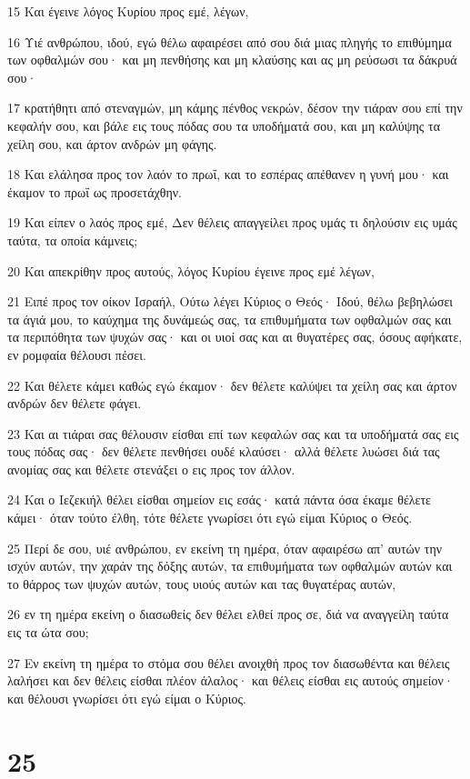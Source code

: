 \par 15 Και έγεινε λόγος Κυρίου προς εμέ, λέγων,
\par 16 Υιέ ανθρώπου, ιδού, εγώ θέλω αφαιρέσει από σου διά μιας πληγής το επιθύμημα των οφθαλμών σου· και μη πενθήσης και μη κλαύσης και ας μη ρεύσωσι τα δάκρυά σου·
\par 17 κρατήθητι από στεναγμών, μη κάμης πένθος νεκρών, δέσον την τιάραν σου επί την κεφαλήν σου, και βάλε εις τους πόδας σου τα υποδήματά σου, και μη καλύψης τα χείλη σου, και άρτον ανδρών μη φάγης.
\par 18 Και ελάλησα προς τον λαόν το πρωΐ, και το εσπέρας απέθανεν η γυνή μου· και έκαμον το πρωΐ ως προσετάχθην.
\par 19 Και είπεν ο λαός προς εμέ, Δεν θέλεις απαγγείλει προς υμάς τι δηλούσιν εις υμάς ταύτα, τα οποία κάμνεις;
\par 20 Και απεκρίθην προς αυτούς, λόγος Κυρίου έγεινε προς εμέ λέγων,
\par 21 Ειπέ προς τον οίκον Ισραήλ, Ούτω λέγει Κύριος ο Θεός· Ιδού, θέλω βεβηλώσει τα άγιά μου, το καύχημα της δυνάμεώς σας, τα επιθυμήματα των οφθαλμών σας και τα περιπόθητα των ψυχών σας· και οι υιοί σας και αι θυγατέρες σας, όσους αφήκατε, εν ρομφαία θέλουσι πέσει.
\par 22 Και θέλετε κάμει καθώς εγώ έκαμον· δεν θέλετε καλύψει τα χείλη σας και άρτον ανδρών δεν θέλετε φάγει.
\par 23 Και αι τιάραι σας θέλουσιν είσθαι επί των κεφαλών σας και τα υποδήματά σας εις τους πόδας σας· δεν θέλετε πενθήσει ουδέ κλαύσει· αλλά θέλετε λυώσει διά τας ανομίας σας και θέλετε στενάξει ο εις προς τον άλλον.
\par 24 Και ο Ιεζεκιήλ θέλει είσθαι σημείον εις εσάς· κατά πάντα όσα έκαμε θέλετε κάμει· όταν τούτο έλθη, τότε θέλετε γνωρίσει ότι εγώ είμαι Κύριος ο Θεός.
\par 25 Περί δε σου, υιέ ανθρώπου, εν εκείνη τη ημέρα, όταν αφαιρέσω απ' αυτών την ισχύν αυτών, την χαράν της δόξης αυτών, τα επιθυμήματα των οφθαλμών αυτών και το θάρρος των ψυχών αυτών, τους υιούς αυτών και τας θυγατέρας αυτών,
\par 26 εν τη ημέρα εκείνη ο διασωθείς δεν θέλει ελθεί προς σε, διά να αναγγείλη ταύτα εις τα ώτα σου;
\par 27 Εν εκείνη τη ημέρα το στόμα σου θέλει ανοιχθή προς τον διασωθέντα και θέλεις λαλήσει και δεν θέλεις είσθαι πλέον άλαλος· και θέλεις είσθαι εις αυτούς σημείον· και θέλουσι γνωρίσει ότι εγώ είμαι ο Κύριος.

\chapter{25}


